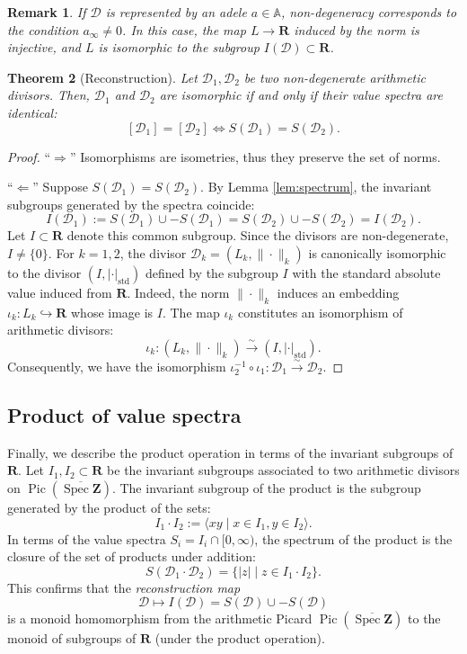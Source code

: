 \documentclass[11pt,a4paper]{article}
\newcommand{\Z}{\mathbf{Z}}
\newcommand{\R}{\mathbf{R}}
\newcommand{\A}{\mathbb{A}}
\def\spzb{\overline{\Spec \Z}}
\newcommand{\Spec}{\operatorname{Spec}}
\def\Pic{\operatorname{Pic}}
\theoremstyle{plain}
\newtheorem{thm}{Theorem}[section]
\newtheorem{rem}[thm]{Remark}
\theoremstyle{definition} %
\begin{document}
\begin{rem}
If $\mathcal D$ is represented by an adele $a \in \A$, non-degeneracy corresponds to the condition $a_\infty \neq 0$. In this case, the map $L \to \R$ induced by the norm is injective, and $L$ is isomorphic to the subgroup $I(\mathcal D) \subset \R$.
\end{rem}

\begin{thm}[Reconstruction]\label{rec}
Let $\mathcal{D}_1, \mathcal{D}_2$ be two non-degenerate arithmetic divisors.
Then,  $\mathcal{D}_1$ and $\mathcal{D}_2$ are isomorphic if and only if their value spectra are identical:
\[
[\mathcal{D}_1] = [\mathcal{D}_2] \iff S(\mathcal{D}_1) = S(\mathcal{D}_2).
\]
\end{thm}

\begin{proof}
``$\Rightarrow$'' Isomorphisms are isometries, thus they preserve the set of norms.

``$\Leftarrow$'' Suppose $S(\mathcal{D}_1) = S(\mathcal{D}_2)$.
By Lemma \ref{lem:spectrum}, the invariant subgroups generated by the spectra coincide:
\[
I(\mathcal{D}_1) := S(\mathcal{D}_1) \cup -S(\mathcal{D}_1) = S(\mathcal{D}_2) \cup -S(\mathcal{D}_2) = I(\mathcal{D}_2).
\]
Let $I \subset \R$ denote this common subgroup. Since the divisors are non-degenerate, $I \neq \{0\}$.
For $k=1,2$, the divisor $\mathcal{D}_k = (L_k, \|\cdot\|_k)$ is canonically isomorphic to the divisor $(I, |\cdot|_{\text{std}})$ defined by the subgroup $I$ with the standard absolute value induced from $\R$.
Indeed, the norm $\|\cdot\|_k$ induces an embedding $\iota_k: L_k \hookrightarrow \R$ whose image is $I$. The map $\iota_k$ constitutes an isomorphism of arithmetic divisors:
\[
\iota_k: (L_k, \|\cdot\|_k) \xrightarrow{\sim} (I, |\cdot|_{\text{std}}).
\]
Consequently, we have the isomorphism $\iota_2^{-1} \circ \iota_1: \mathcal{D}_1 \xrightarrow{\sim} \mathcal{D}_2$.
\end{proof}

\subsection{Product of value spectra}

Finally, we describe the product operation in terms of the invariant subgroups of $\R$.
Let $I_1, I_2 \subset \R$ be the invariant subgroups associated to two arithmetic divisors on $\Pic(\spzb)$. The invariant subgroup of the product is the subgroup generated by the product of the sets:
\[
I_1 \cdot I_2 := \langle xy \mid x \in I_1, y \in I_2 \rangle.
\]
In terms of the value spectra $S_i = I_i \cap [0, \infty)$, the spectrum of the product is the closure of the set of products under addition:
\[
S(\mathcal{D}_1 \cdot \mathcal{D}_2) = \{ |z| \mid z \in I_1 \cdot I_2 \}.
\]
This confirms that the \emph{reconstruction map} 
\[
\mathcal{D} \mapsto I(\mathcal{D})= S(\mathcal{D}) \cup -S(\mathcal{D})
\]
is a monoid homomorphism from the arithmetic Picard $\Pic(\spzb)$ to the monoid of subgroups of $\R$ (under the product operation).
\end{document}
